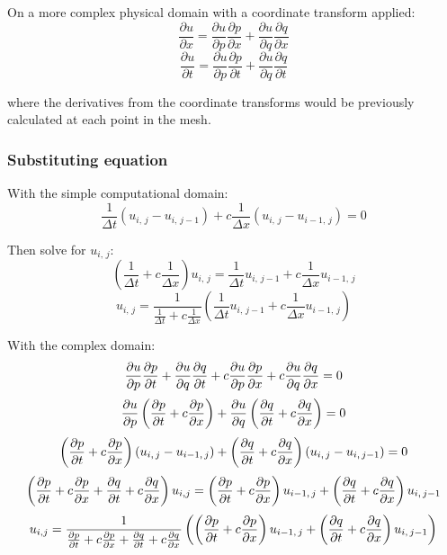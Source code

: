 \documentclass[a4paper]{article}
\begin{document}
On a more complex physical domain with a coordinate transform applied:
$$ \frac{\partial u}{\partial x} = \frac{\partial u}{\partial p}\frac{\partial p}{\partial x} + \frac{\partial u}{\partial q}\frac{\partial q}{\partial x} $$
$$\frac{\partial u}{\partial t} = \frac{\partial u}{\partial p}\frac{\partial p}{\partial t} + \frac{\partial u}{\partial q}\frac{\partial q}{\partial t}$$

where the derivatives from the coordinate transforms would be previously calculated at each point in the mesh.

\subsubsection{Substituting equation}

With the simple computational domain:
$$\frac{1}{\Delta t} (u_{i, \,j} - u_{i, \,j-1}) + c \frac{1}{\Delta x} (u_{i, \,j} - u_{i-1, \,j}) = 0$$

Then solve for $u_{i, \,j}$:
$$(\frac{1}{\Delta t} + c\frac{1}{\Delta x})  u_{i, \,j} = \frac{1}{\Delta t}  u_{i, \,j-1} + c \frac{1}{\Delta x}  u_{i-1, \,j}$$
$$u_{i, \,j} = \frac{1}{\frac{1}{\Delta t} + c\frac{1}{\Delta x}} \left(\frac{1}{\Delta t} u_{i, \,j-1} + c \frac{1}{\Delta x} u_{i-1, \,j}\right)$$


With the complex domain:
$$ \frac{\partial u}{\partial p}\frac{\partial p}{\partial t}  +  \frac{\partial u}{\partial q}\frac{\partial q}{\partial t}  + c\frac{\partial u}{\partial p}\frac{\partial p}{\partial x}  +  c\frac{\partial u}{\partial q}\frac{\partial q}{\partial x} = 0  $$
$$ \frac{\partial u}{\partial p}\left(\frac{\partial p}{\partial t} + c\frac{\partial p}{\partial x}\right) + \frac{\partial u}{\partial q}\left(\frac{\partial q}{\partial t}  + c \frac{\partial q}{\partial x}\right) = 0  $$
$$ \left(\frac{\partial p}{\partial t} + c\frac{\partial p}{\partial x}\right) (u_{i, \,j} - u_{i-1, \,j}) + \left(\frac{\partial q}{\partial t}  + c \frac{\partial q}{\partial x}\right) (u_{i, \,j} - u_{i, \,j-1}) = 0  $$
$$ \left(\frac{\partial p}{\partial t} + c\frac{\partial p}{\partial x} + \frac{\partial q}{\partial t}  + c \frac{\partial q}{\partial x}\right) u_{i, j} = \left(\frac{\partial p}{\partial t} + c\frac{\partial p}{\partial x}\right) u_{i-1, \,j} + \left(\frac{\partial q}{\partial t}  + c \frac{\partial q}{\partial x}\right) u_{i, \,j-1} $$
$$ u_{i, j} = \frac{1}{\frac{\partial p}{\partial t} + c\frac{\partial p}{\partial x} + \frac{\partial q}{\partial t}  + c \frac{\partial q}{\partial x}} \left(\left(\frac{\partial p}{\partial t} + c\frac{\partial p}{\partial x}\right) u_{i-1, \,j} + \left(\frac{\partial q}{\partial t}  + c \frac{\partial q}{\partial x}\right) u_{i, \,j-1}\right) $$
\end{document}
